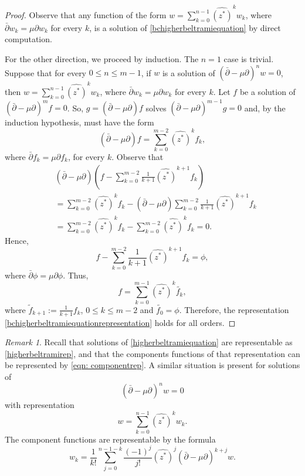 \documentclass[12pt,reqno]{amsart}
\theoremstyle{definition}
\theoremstyle{remark}
\newtheorem{comm}[theorem]{Remark}
\newcommand{\p}{\partial}
\newcommand{\dbar}{\bar\partial}
\begin{document}
\begin{proof}
Observe that any function of the form $w = \sum_{k=0}^{n-1} \widehat{(z^*)}^k w_k$, where $\dbar w_k = \mu \p w_k$ for every $k$, is a solution of \eqref{bchigherbeltramiequation} by direct computation. 

For the other direction, we proceed by induction. The $n =1$ case is trivial. Suppose that for every $0 \leq n \leq m-1$, if $w$ is a solution of $(\dbar - \mu\p)^n w = 0$, then $w = \sum_{k=0}^{n-1} \widehat{(z^*)}^k w_k$, where $\dbar w_k = \mu \p w_k$ for every $k$. Let $f$ be a solution of $(\dbar - \mu \p)^m f = 0$. So, $ g = (\dbar - \mu \p)f$ solves $(\dbar - \mu\p)^{m-1}g = 0$ and, by the induction hypothesis, must have the form
\[
    (\dbar - \mu \p)f = \sum_{k=0}^{m-2
    }\widehat{(z^*)}^kf_k,
\]
where $\dbar f_k = \mu \p f_k$, for every $k$. Observe that 
\begin{align*}
    & (\dbar - \mu \p)\left( f - \sum_{k=0}^{m-2}\frac{1}{k+1} \widehat{(z^*)}^{k+1} f_k\right)\\
    &= \sum_{k=0}^{m-2
    }\widehat{(z^*)}^kf_k - (\dbar - \mu \p)\sum_{k=0}^{m-2}\frac{1}{k+1} \widehat{(z^*)}^{k+1} f_k \\
    &= \sum_{k=0}^{m-2
    }\widehat{(z^*)}^kf_k - \sum_{k=0}^{m-2
    }\widehat{(z^*)}^kf_k  = 0.
\end{align*}
Hence, 
\[
    f - \sum_{k=0}^{m-2}\frac{1}{k+1} \widehat{(z^*)}^{k+1} f_k = \phi,
\]
where $\dbar \phi = \mu \p \phi$. Thus, 
\[
     f = \sum_{k=0}^{m-1} \widehat{(z^*)}^k \tilde{f_k}, 
\]
where $\tilde{f}_{k+1} := \frac{1}{k+1}f_{k}$, $0 \leq k \leq m-2$ and $\tilde{f_0} = \phi$. Therefore, the representation \eqref{bchigherbeltramiequationrepresentation} holds for all orders. 

\end{proof}

\begin{comm}
    Recall that solutions of \eqref{higherbeltramiequation} are representable as \eqref{higherbeltramirep}, and that the components functions of that representation can be represented by \eqref{eqn: componentrep}. A similar situation is present for solutions of 
    \[
        \left( \dbar - \mu\p \right)^n w  = 0
    \]
    with representation 
    \[
        w = \sum_{k=0}^{n-1} \widehat{ (z^*)}^k w_k.
    \]
    The component functions are representable by the formula
    \begin{equation}\label{eqn: bccomponentrep}
         w_k = \frac{1}{k!} \sum_{j=0}^{n-1-k}\frac{(-1)^j}{j!}  \widehat{(z^*)}^j \left(\dbar - \mu\p\right)^{k+j} w.
    \end{equation}
\end{comm}
\end{document}
